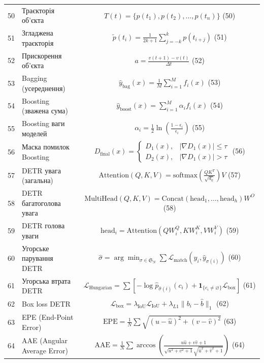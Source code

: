 \documentclass[14pt, a4paper]{extarticle}
\numberwithin{equation}{section}
\begin{document}
\begin{longtable}{|c|p{10cm}|c|}
50 & Траєкторія об'єкта & $T(t) = \{p(t_1), p(t_2), \ldots, p(t_n)\}$ \hfill (50) \\
51 & Згладжена траєкторія & $\tilde{p}(t_i) = \frac{1}{2k+1} \sum_{j=-k}^{k} p(t_{i+j})$ \hfill (51) \\
52 & Прискорення об'єкта & $a = \frac{v(t+1) - v(t)}{\Delta t}$ \hfill (52) \\
53 & Bagging (усереднення) & $\hat{y}_{\text{bag}}(x) = \frac{1}{M} \sum_{i=1}^{M} f_i(x)$ \hfill (53) \\
54 & Boosting (зважена сума) & $\hat{y}_{\text{boost}}(x) = \sum_{i=1}^{M} \alpha_i f_i(x)$ \hfill (54) \\
55 & Boosting ваги моделей & $\alpha_i = \frac{1}{2} \ln\left(\frac{1-\epsilon_i}{\epsilon_i}\right)$ \hfill (55) \\
56 & Маска помилок Boosting & $D_{\text{final}}(x) = \begin{cases} D_1(x), & |\nabla D_1(x)| \leq \tau \\ D_2(x), & |\nabla D_1(x)| > \tau \end{cases}$ \hfill (56) \\
57 & DETR увага (загальна) & $\text{Attention}(Q,K,V) = \text{softmax}\left(\frac{QK^T}{\sqrt{d_k}}\right)V$ \hfill (57) \\
58 & DETR багатоголова увага & $\text{MultiHead}(Q,K,V) = \text{Concat}(\text{head}_1,\ldots,\text{head}_h)W^O$ \hfill (58) \\
59 & DETR голова уваги & $\text{head}_i = \text{Attention}(QW_i^Q, KW_i^K, VW_i^V)$ \hfill (59) \\
60 & Угорське парування DETR & $\hat{\sigma} = \arg\min_{\sigma \in \mathfrak{S}_N} \sum \mathcal{L}_{\text{match}}(y_i, \hat{y}_{\sigma(i)})$ \hfill (60) \\
61 & Угорська втрата DETR & $\mathcal{L}_{\text{Hungarian}} = \sum [-\log \hat{p}_{\hat{\sigma}(i)}(c_i) + \mathbf{1}_{\{c_i \neq \varnothing\}} \mathcal{L}_{\text{box}}]$ \hfill (61) \\
62 & Box loss DETR & $\mathcal{L}_{\text{box}} = \lambda_{\text{IoU}} \mathcal{L}_{\text{IoU}} + \lambda_{L1} \|b_i - \hat{b}\|_1$ \hfill (62) \\
63 & EPE (End-Point Error) & $\text{EPE} = \frac{1}{N} \sum \sqrt{(u-\hat{u})^2 + (v-\hat{v})^2}$ \hfill (63) \\
64 & AAE (Angular Average Error) & $\text{AAE} = \frac{1}{N} \sum \arccos\left(\frac{u\hat{u}+v\hat{v}+1}{\sqrt{u^2+v^2+1}\sqrt{\hat{u}^2+\hat{v}^2+1}}\right)$ \hfill (64) \\

\end{longtable}
\end{document}
